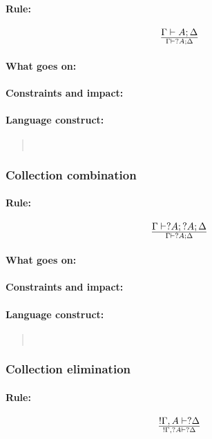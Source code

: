 \documentclass[a4paper]{article}
\begin{document}
\paragraph{Rule:}
$$
{
  \Gamma \vdash A;\Delta
}\over{
  \Gamma \vdash ?A;\Delta
}
$$
\paragraph{What goes on:}
\paragraph{Constraints and impact:}
\paragraph{Language construct:}
\begin{quote}\tt
\end{quote}

\subsubsection{Collection combination}
\paragraph{Rule:}
$$
{
  \Gamma \vdash ?A; ?A; \Delta
}\over{
  \Gamma \vdash ?A; \Delta
}
$$
\paragraph{What goes on:}
\paragraph{Constraints and impact:}
\paragraph{Language construct:}
\begin{quote}\tt
\end{quote}

\subsubsection{Collection elimination}
\paragraph{Rule:}
$$
{
  !\Gamma, A \vdash ?\Delta
}\over{
  !\Gamma, ?A \vdash ?\Delta
}
$$
\end{document}
